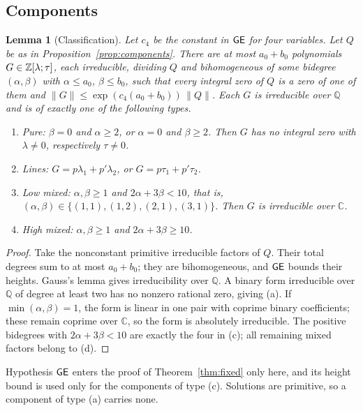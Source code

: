 \documentclass[11pt,reqno]{amsart}
\newtheorem{lemma}[theorem]{Lemma}
\theoremstyle{definition}
\theoremstyle{remark}
\numberwithin{equation}{section}
\newcommand{\Q}{\mathbb Q}\newcommand{\C}{\mathbb C}
\begin{document}
\subsection{Components}
\begin{lemma}[Classification]\label{lem:factor}
Let $c_4$ be the constant in $\mathsf{GE}$ for four variables. Let $Q$ be as
in Proposition~\ref{prop:components}. There are at most $a_0+b_0$
polynomials $G\in\mathbb Z[\lambda;\tau]$, each irreducible, dividing $Q$ and
bihomogeneous of some bidegree $(\alpha,\beta)$ with $\alpha\le a_0$,
$\beta\le b_0$, such that every integral zero of $Q$ is a zero of one of
them and $\|G\|\le\exp(c_4(a_0+b_0))\,\|Q\|$. Each $G$ is irreducible over
$\Q$ and is of exactly one of the following types.
\begin{enumerate}[label=\textup{(\alph*)}]
\item \emph{Pure}: $\beta=0$ and $\alpha\ge2$, or $\alpha=0$ and
$\beta\ge2$. Then $G$ has no integral zero with $\lambda\ne0$, respectively
$\tau\ne0$.
\item \emph{Lines}: $G=p\lambda_1+p'\lambda_2$, or
$G=p\tau_1+p'\tau_2$.
\item \emph{Low mixed}: $\alpha,\beta\ge1$ and $2\alpha+3\beta<10$,
that is, $(\alpha,\beta)\in\{(1,1),(1,2),(2,1),(3,1)\}$. Then $G$ is
irreducible over $\C$.
\item \emph{High mixed}: $\alpha,\beta\ge1$ and $2\alpha+3\beta\ge10$.
\end{enumerate}
\end{lemma}
\begin{proof}
Take the nonconstant primitive irreducible factors of $Q$.
Their total degrees sum to at most $a_0+b_0$; they are bihomogeneous,
and $\mathsf{GE}$ bounds their heights. Gauss's lemma gives irreducibility
over $\Q$. A binary form irreducible over $\Q$ of degree at least
two has no nonzero rational zero, giving (a). If
$\min(\alpha,\beta)=1$, the form is linear in one pair with coprime
binary coefficients; these remain coprime over $\C$, so the form
is absolutely irreducible. The positive bidegrees with
$2\alpha+3\beta<10$ are exactly the four in (c); all remaining
mixed factors belong to (d).
\end{proof}
Hypothesis $\mathsf{GE}$ enters the proof of Theorem~\ref{thm:fixed} only here, and its height
bound is used only for the components of type (c). Solutions are primitive,
so a component of type (a) carries none.
\end{document}
